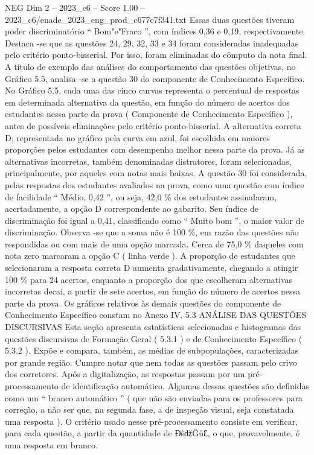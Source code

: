 \begin{textsample}{NEG Dim 2 – 2023\_c6 – Score 1.00 – 2023\_c6/enade\_2023\_eng\_prod\_c677c7f341.txt}
Essas duas questões tiveram poder discriminatório “ Bom"e"Fraco ”, com índices 0,36 e 0,19, respectivamente.
Destaca -se que as questões 24, 29, 32, 33 e 34 foram consideradas inadequadas pelo critério ponto-bisserial.
Por isso, foram eliminadas do cômputo da nota final.
A título de exemplo das análises do comportamento das questões objetivas, no Gráfico 5.5, analisa -se a questão 30 do componente de Conhecimento Específico.
No Gráfico 5.5, cada uma das cinco curvas representa o percentual de respostas em determinada alternativa da questão, em função do número de acertos dos estudantes nessa parte da prova ( Componente de Conhecimento Específico ), antes de possíveis eliminações pelo critério ponto-bisserial.
A alternativa correta D, representada no gráfico pela curva em azul, foi escolhida em maiores proporções pelos estudantes com desempenho melhor nessa parte da prova.
Já as alternativas incorretas, também denominadas distratores, foram selecionadas, principalmente, por aqueles com notas mais baixas.
A questão 30 foi considerada, pelas respostas dos estudantes avaliados na prova, como uma questão com índice de facilidade “ Médio, 0,42 ”, ou seja, 42,0 \% dos estudantes assinalaram, acertadamente, a opção D correspondente ao gabarito.
Seu índice de discriminação foi igual a 0,41, classificado como “ Muito bom ”, o maior valor de discriminação.
Observa -se que a soma não é 100 \%, em razão das questões não respondidas ou com mais de uma opção marcada.
Cerca de 75,0 \% daqueles com nota zero marcaram a opção C ( linha verde ).
A proporção de estudantes que selecionaram a resposta correta D aumenta gradativamente, chegando a atingir 100 \% para 24 acertos, enquanto a proporção dos que escolheram alternativas incorretas decai, a partir de sete acertos, em função do número de acertos nessa parte da prova.
Os gráficos relativos às demais questões do componente de Conhecimento Específico constam no Anexo IV. 5.3 ANÁLISE DAS QUESTÕES DISCURSIVAS Esta seção apresenta estatísticas selecionadas e histogramas das questões discursivas de Formação Geral ( 5.3.1 ) e de Conhecimento Específico ( 5.3.2 ).
Expõe e compara, também, as médias de subpopulações, caracterizadas por grande região.
Cumpre notar que nem todas as questões passam pelo crivo dos corretores.
Após a digitalização, as respostas passam por um pré-processamento de identificação automático.
Algumas dessas questões são definidas como um “ branco automático ” ( que não são enviadas para os professores para correção, a não ser que, na segunda fase, a de inspeção visual, seja constatada uma resposta ).
O critério usado nesse pré-processamento consiste em verificar, para cada questão, a partir da quantidade de ƉŝǆĞůƐ, o que, provavelmente, é uma resposta em branco.

\end{textsample}
